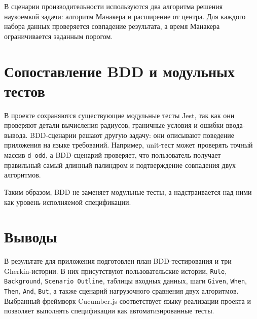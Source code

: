 В сценарии производительности используются два алгоритма решения наукоемкой задачи: алгоритм Манакера и расширение от центра. Для каждого набора данных проверяется совпадение результата, а время Манакера ограничивается заданным порогом.

\section{Сопоставление BDD и модульных тестов} \label{ch1:sec5}

В проекте сохраняются существующие модульные тесты Jest, так как они проверяют детали вычисления радиусов, граничные условия и ошибки ввода-вывода. BDD-сценарии решают другую задачу: они описывают поведение приложения на языке требований. Например, unit-тест может проверять точный массив \texttt{d\_odd}, а BDD-сценарий проверяет, что пользователь получает правильный самый длинный палиндром и подтверждение совпадения двух алгоритмов.

Таким образом, BDD не заменяет модульные тесты, а надстраивается над ними как уровень исполняемой спецификации.

\section{Выводы} \label{ch1:conclusion}

В результате для приложения подготовлен план BDD-тестирования и три Gherkin-истории. В них присутствуют пользовательские истории, \texttt{Rule}, \texttt{Background}, \texttt{Scenario Outline}, таблицы входных данных, шаги \texttt{Given}, \texttt{When}, \texttt{Then}, \texttt{And}, \texttt{But}, а также сценарий нагрузочного сравнения двух алгоритмов. Выбранный фреймворк Cucumber.js соответствует языку реализации проекта и позволяет выполнять спецификации как автоматизированные тесты.
